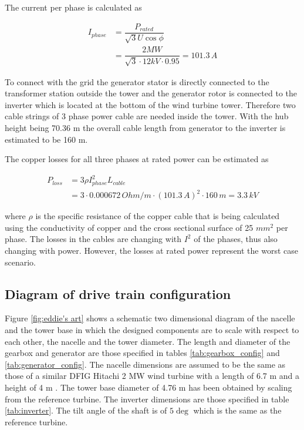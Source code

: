The current per phase is calculated as

\begin{align}
    I_{phase} &= \dfrac{P_{rated}}{\sqrt{3}U \cos \phi} \\
    &= \dfrac{2 MW}{\sqrt{3} \cdot 12 kV \cdot 0.95} = 101.3\,A \nonumber
\end{align}

To connect with the grid the generator stator is directly connected to the transformer station outside the tower and the generator rotor is connected to the inverter which is located at the bottom of the wind turbine tower. Therefore two cable strings of 3 phase power cable are needed inside the tower. With the hub height being 70.36 m the overall cable length from generator to the inverter is estimated to be 160 m. 

The copper losses for all three phases at rated power can be estimated as

\begin{align}
    P_{loss} &= 3 \rho I_{phase}^2 L_{cable} \\
    &= 3 \cdot 0.000672\,Ohm/m \cdot \left(101.3\,A\right)^2 \cdot 160\,m = 3.3\,kV \nonumber
\end{align}

where $\rho$ is the specific resistance of the copper cable that is being calculated using the conductivity of copper and the cross sectional surface of 25 $mm^2$ per phase. The losses in the cables are changing with $I^2$ of the phases, thus also changing with power. However, the losses at rated power represent the worst case scenario. 

\subsection{Diagram of drive train configuration}

Figure \ref{fig:eddie's art} shows a schematic two dimensional diagram of the nacelle and the tower base in which the designed components are to scale with respect to each other, the nacelle and the tower diameter. The length and diameter of the gearbox and generator are those specified in tables \ref{tab:gearbox_config} and \ref{tab:generator_config}. The nacelle dimensions are assumed to be the same as those of a similar DFIG Hitachi 2 MW wind turbine with a length of 6.7 m and a height of 4 m \cite{hitachi}. The tower base diameter of 4.76 m has been obtained by scaling from the reference turbine. The inverter dimensions are those specified in table \ref{tab:inverter}. The tilt angle of the shaft is of $5\deg$ which is the same as the reference turbine.


